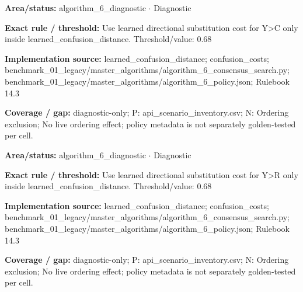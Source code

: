 \begin{tcolorbox}[enhanced,breakable,colback=white,colframe=Muted!45,boxrule=0.45pt,arc=1.5pt,left=6pt,right=6pt,top=5pt,bottom=5pt,title={\texttt{A6-LEARNED-SUBSTITUTION-Y-C}},title after break={\texttt{A6-LEARNED-SUBSTITUTION-Y-C}\ (continued)},fonttitle=\headingfont\bfseries\color{Navy},coltitle=Navy]
\textbf{Area/status:} algorithm\_\allowbreak{}6\_\allowbreak{}diagnostic $\boldsymbol{\cdot}$ Diagnostic\par
\smallskip
\textbf{Exact rule / threshold:} Use learned directional substitution cost for Y>C only inside learned\_\allowbreak{}confusion\_\allowbreak{}distance. Threshold/\allowbreak{}value: 0.68\par
\smallskip
\textbf{Implementation source:} learned\_\allowbreak{}confusion\_\allowbreak{}distance; confusion\_\allowbreak{}costs; benchmark\_\allowbreak{}01\_\allowbreak{}legacy/\allowbreak{}master\_\allowbreak{}algorithms/\allowbreak{}algorithm\_\allowbreak{}6\_\allowbreak{}consensus\_\allowbreak{}search.py; benchmark\_\allowbreak{}01\_\allowbreak{}legacy/\allowbreak{}master\_\allowbreak{}algorithms/\allowbreak{}algorithm\_\allowbreak{}6\_\allowbreak{}policy.json; Rulebook 14.3\par
\smallskip
\textbf{Coverage / gap:} diagnostic-only; P: api\_\allowbreak{}scenario\_\allowbreak{}inventory.csv; N: Ordering exclusion; No live ordering effect; policy metadata is not separately golden-tested per cell.
\end{tcolorbox}
\begin{tcolorbox}[enhanced,breakable,colback=white,colframe=Muted!45,boxrule=0.45pt,arc=1.5pt,left=6pt,right=6pt,top=5pt,bottom=5pt,title={\texttt{A6-LEARNED-SUBSTITUTION-Y-R}},title after break={\texttt{A6-LEARNED-SUBSTITUTION-Y-R}\ (continued)},fonttitle=\headingfont\bfseries\color{Navy},coltitle=Navy]
\textbf{Area/status:} algorithm\_\allowbreak{}6\_\allowbreak{}diagnostic $\boldsymbol{\cdot}$ Diagnostic\par
\smallskip
\textbf{Exact rule / threshold:} Use learned directional substitution cost for Y>R only inside learned\_\allowbreak{}confusion\_\allowbreak{}distance. Threshold/\allowbreak{}value: 0.68\par
\smallskip
\textbf{Implementation source:} learned\_\allowbreak{}confusion\_\allowbreak{}distance; confusion\_\allowbreak{}costs; benchmark\_\allowbreak{}01\_\allowbreak{}legacy/\allowbreak{}master\_\allowbreak{}algorithms/\allowbreak{}algorithm\_\allowbreak{}6\_\allowbreak{}consensus\_\allowbreak{}search.py; benchmark\_\allowbreak{}01\_\allowbreak{}legacy/\allowbreak{}master\_\allowbreak{}algorithms/\allowbreak{}algorithm\_\allowbreak{}6\_\allowbreak{}policy.json; Rulebook 14.3\par
\smallskip
\textbf{Coverage / gap:} diagnostic-only; P: api\_\allowbreak{}scenario\_\allowbreak{}inventory.csv; N: Ordering exclusion; No live ordering effect; policy metadata is not separately golden-tested per cell.
\end{tcolorbox}
